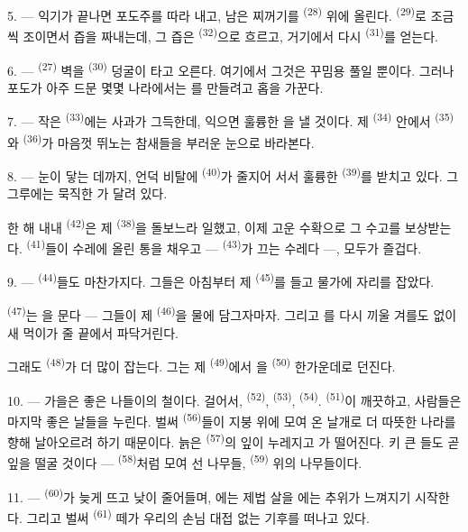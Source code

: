 5. --- 익기가 끝나면 포도주를 따라 내고, 남은 찌꺼기를 
\textsuperscript{(28)} 위에 올린다.  \textsuperscript{(29)}로 조금씩 조이면서
즙을 짜내는데, 그 즙은  \textsuperscript{(32)}으로 흐르고, 거기에서 다시
 \textsuperscript{(31)}를 얻는다.

\VUsaut{6.0mm}
\VUsaut{3.4mm}

6. ---  \textsuperscript{(27)} 벽을  \textsuperscript{(30)} 덩굴이
타고 오른다. 여기에서 그것은 꾸밈용 풀일 뿐이다. 그러나 포도가 아주 드문 몇몇 나라에서는
를 만들려고 홉을 가꾼다.

7. --- 작은  \textsuperscript{(33)}에는 사과가 그득한데, 익으면 훌륭한
을 낼 것이다. 제  \textsuperscript{(34)} 안에서
 \textsuperscript{(35)}와  \textsuperscript{(36)}가 마음껏
뛰노는 참새들을 부러운 눈으로 바라본다.

8. --- 눈이 닿는 데까지, 언덕 비탈에  \textsuperscript{(40)}가 줄지어
서서 훌륭한  \textsuperscript{(39)}를 받치고 있다. 그 그루에는 묵직한
가 달려 있다.

한 해 내내  \textsuperscript{(42)}은 제 
\textsuperscript{(38)}을 돌보느라 일했고, 이제 고운 수확으로 그 수고를 보상받는다.
 \textsuperscript{(41)}들이 수레에 올린 통을 채우고 —
 \textsuperscript{(43)}가 끄는 수레다 —, 모두가 즐겁다.

\VUsaut{5.0mm}
\VUsaut{3.4mm}

9. ---  \textsuperscript{(44)}들도 마찬가지다. 그들은 아침부터 제
 \textsuperscript{(45)}를 들고 물가에 자리를 잡았다.

 \textsuperscript{(47)}는 을 문다 — 그들이 제
 \textsuperscript{(46)}을 물에 담그자마자. 그리고 를 다시 끼울
겨를도 없이 새 먹이가 줄 끝에서 파닥거린다.

그래도  \textsuperscript{(48)}가 더 많이 잡는다. 그는 제
 \textsuperscript{(49)}에서 을  \textsuperscript{(50)}
한가운데로 던진다.

10. --- 가을은 좋은 나들이의 철이다. 걸어서,  \textsuperscript{(52)},
 \textsuperscript{(53)},  \textsuperscript{(54)}.
 \textsuperscript{(51)}이 깨끗하고, 사람들은 마지막 좋은 날들을 누린다. 벌써
 \textsuperscript{(56)}들이 지붕 위에 모여 온 날개로 더 따뜻한 나라를 향해
날아오르려 하기 때문이다. 늙은  \textsuperscript{(57)}의 잎이 누레지고
가 떨어진다. 키 큰 들도 곧 잎을 떨굴 것이다 —
 \textsuperscript{(58)}처럼 모여 선 나무들, 
\textsuperscript{(59)} 위의 나무들이다.

11. ---  \textsuperscript{(60)}가 늦게 뜨고 낮이 줄어들며, 에는
제법 살을 에는 추위가 느껴지기 시작한다. 그리고 벌써 
\textsuperscript{(61)} 떼가 우리의 손님 대접 없는 기후를 떠나고 있다.

\VUsaut{6.0mm}
\VUfilet{22mm}
